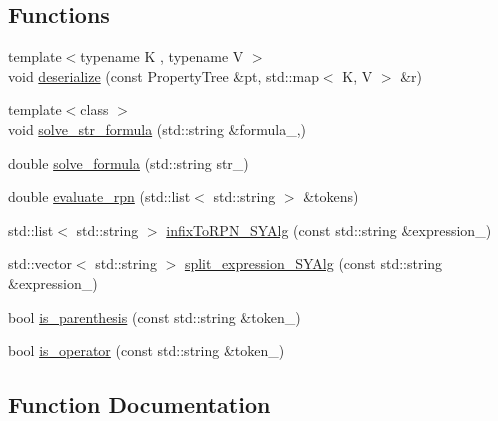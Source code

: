 \subsection*{Functions}
\begin{DoxyCompactItemize}
\item 
{\footnotesize template$<$typename K , typename V $>$ }\\void \hyperlink{namespaceserialize_af7e18cf15b955d078b7fc036042cb083}{deserialize} (const Property\+Tree \&pt, std\+::map$<$ K, V $>$ \&r)
\item 
{\footnotesize template$<$class $>$ }\\void \hyperlink{namespaceserialize_a2c1ea7730402ca3407bced2235efe3fd}{solve\+\_\+str\+\_\+formula} (std\+::string \&formula\+\_\+,)
\end{DoxyCompactItemize}
{\bf }\par
\begin{DoxyCompactItemize}
\item 
double \hyperlink{namespaceserialize_a8efbe7c32352f8ff750211235e3d5361}{solve\+\_\+formula} (std\+::string str\+\_\+)
\item 
double \hyperlink{namespaceserialize_ade99c17935e107385ad259ba3111457e}{evaluate\+\_\+rpn} (std\+::list$<$ std\+::string $>$ \&tokens)
\item 
std\+::list$<$ std\+::string $>$ \hyperlink{namespaceserialize_a2876e5d84edeaa969e25a176eb582bb3}{infix\+To\+R\+P\+N\+\_\+\+S\+Y\+Alg} (const std\+::string \&expression\+\_\+)
\item 
std\+::vector$<$ std\+::string $>$ \hyperlink{namespaceserialize_a06d144912d025816fe84c532295d274a}{split\+\_\+expression\+\_\+\+S\+Y\+Alg} (const std\+::string \&expression\+\_\+)
\item 
bool \hyperlink{namespaceserialize_a38acccd96ada5f0927f924531ac1498e}{is\+\_\+parenthesis} (const std\+::string \&token\+\_\+)
\item 
bool \hyperlink{namespaceserialize_a897be0f6c9fe37021e11bfeb732d3500}{is\+\_\+operator} (const std\+::string \&token\+\_\+)
\end{DoxyCompactItemize}



\subsection{Function Documentation}
\hypertarget{namespaceserialize_af7e18cf15b955d078b7fc036042cb083}{}
